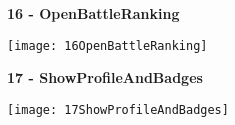 \begin{minipage}{\textwidth}
	\textbf{16 - OpenBattleRanking}
	\begin{center}
		\texttt{[image: 16OpenBattleRanking]}
	\end{center}

\vspace*{1cm}

	\textbf{17 - ShowProfileAndBadges}
	\begin{center}
		\texttt{[image: 17ShowProfileAndBadges]}
	\end{center}
\end{minipage}